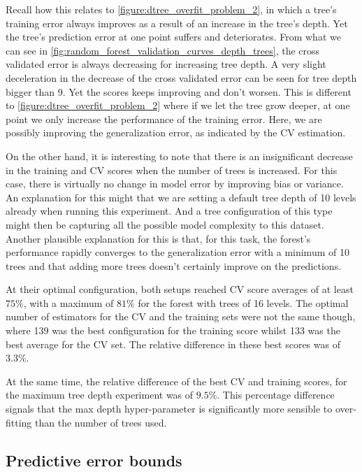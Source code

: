 Recall how this relates to \cref{figure:dtree_overfit_problem_2}, in which a tree's training error always improves as a result of an increase in the tree's depth.
Yet the tree's prediction error at one point suffers and deteriorates.
From what we can see in \cref{fig:random_forest_validation_curves_depth_trees}, the cross validated error is always decreasing for increasing tree depth.
A very slight deceleration in the decrease of the cross validated error can be seen for tree depth bigger than 9.
Yet the scores keeps improving and don't worsen.
This is different to \cref{figure:dtree_overfit_problem_2} where if we let the tree grow deeper, at one point we only increase the performance of the training error.
Here, we are possibly improving the generalization error, as indicated by the CV estimation.

 On the other hand, it is interesting to note that there is an insignificant decrease in the training and CV scores when the number of trees is increased.
For this case, there is virtually no change in model error by improving bias or variance.
 An explanation for this might that we are setting a default tree depth of 10 levels already when running this experiment. And a tree configuration of this type might then be capturing all the possible model complexity to this dataset.
 Another plausible explanation for this is that, for this task, the forest's performance rapidly converges to the generalization error with a minimum of 10 trees and that adding more trees doesn't certainly improve on the predictions.


At their optimal configuration, both setups reached CV score averages of at least $75\%$, with a maximum of $81\%$ for the forest
with trees of 16 levels.
The optimal number of estimators for the CV and the training sets were not the same though, where 139 was the best configuration for the training score whilst 133 was the best average for the CV set.
The relative difference in these best scores was of $3.3\%$.

At the same time, the relative difference of the best CV and training scores, for the maximum tree depth experiment was of $9.5\%$.
This percentage difference signals that the max depth hyper-parameter is significantly more sensible to over-fitting than the number of trees used.


\subsection{Predictive error bounds}\label{subsec:rforest_predictive_error_bounds}

